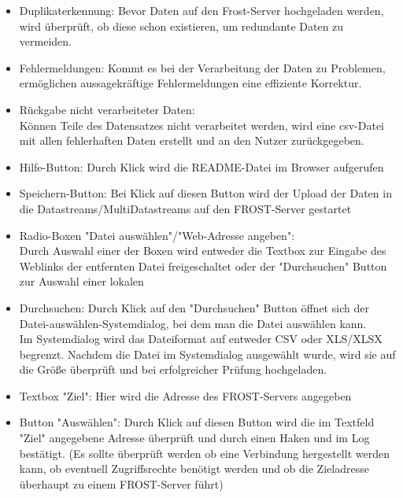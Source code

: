 \documentclass[12 pt]{article}
\begin{document}
\begin{itemize}
		\item Duplikaterkennung: Bevor Daten auf den Frost-Server hochgeladen werden, wird überprüft, ob diese schon existieren, um redundante Daten zu vermeiden.
		\item Fehlermeldungen: Kommt es bei der Verarbeitung der Daten zu Problemen, ermöglichen aussagekräftige Fehlermeldungen eine effiziente Korrektur.
		\item Rückgabe nicht verarbeiteter Daten: \\Können Teile des Datensatzes nicht verarbeitet werden, wird eine csv-Datei mit allen fehlerhaften Daten erstellt und an den Nutzer zurückgegeben.
	\end{itemize}
	
	\newpage
	
	\begin{itemize}
		\item Hilfe-Button: Durch Klick wird die README-Datei im Browser aufgerufen
		\item Speichern-Button: Bei Klick auf diesen Button wird der Upload der Daten in die Datastreams/MultiDatastreams auf den FROST-Server gestartet
		
		\item Radio-Boxen "Datei auswählen"/"Web-Adresse angeben": \\Durch Auswahl einer der Boxen wird entweder die Textbox zur Eingabe des Weblinks der entfernten Datei freigeschaltet oder der "Durchsuchen"  Button zur Auswahl einer lokalen
		\item Durchsuchen: Durch Klick auf den "Durchsuchen" Button öffnet sich der Datei-auswählen-Systemdialog, bei dem man die Datei auswählen kann.\\ Im Systemdialog wird das Dateiformat auf entweder CSV oder XLS/XLSX begrenzt. Nachdem die Datei im Systemdialog ausgewählt wurde, wird sie auf die Größe überprüft und bei erfolgreicher Prüfung hochgeladen.
		
		\item Textbox \string"Ziel": Hier wird die Adresse des FROST-Servers angegeben
		
		\item Button \string"Auswählen": Durch Klick auf diesen Button wird die im Textfeld \string"Ziel\string" angegebene Adresse überprüft und durch einen Haken und im Log bestätigt. (Es sollte überprüft werden ob eine Verbindung hergestellt werden kann, ob eventuell Zugriffsrechte benötigt werden und ob die Zieladresse überhaupt zu einem FROST-Server führt) 
		

\end{itemize}
\end{document}
